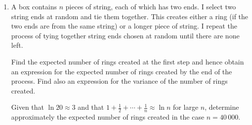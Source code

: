\documentclass[a4, 11pt]{report}
\newlength{\qspace}
\newcounter{qnumber}
\newenvironment{question}%
 {\vspace{\qspace}
  \begin{enumerate}[\bfseries 1\quad][10]%
    \setcounter{enumi}{\value{qnumber}}%
    \item%
 }
{
  \end{enumerate}
  \filbreak
  \stepcounter{qnumber}
 }
\begin{document}
\begin{question}
A box contains $n$ 
pieces of string, each of which has two
ends. I select two string ends at random and tie them together. This
creates
either a ring (if the two ends are from the same string) or a longer
piece of string. I repeat the process of tying together string ends
chosen
at random until there are none left.

Find the expected number of rings created at the first step and
hence obtain an expression for the expected number of rings created
by the end of the process. Find also an expression for the variance
of the number of rings created.

Given that $\ln 20 \approx 3$ and that
$1+ \frac12 + \cdots + \frac 1n \approx \ln n$ for large $n$,
 determine approximately the expected
number of rings created in the case $n=40\,000$. 
\end{question}
\end{document}
